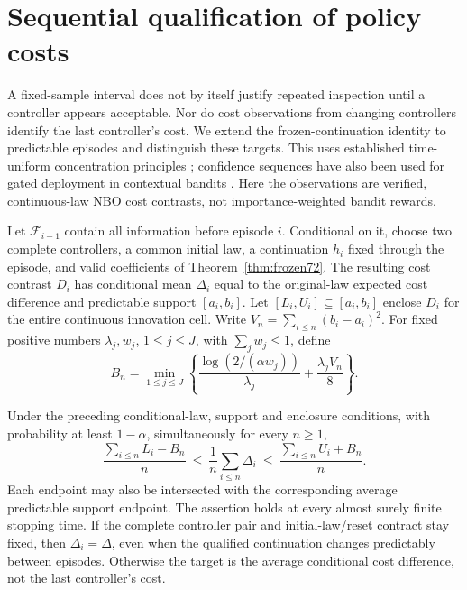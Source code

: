 \section{Sequential qualification of policy costs}\label{sec:sequential73}
A fixed-sample interval does not by itself justify repeated inspection until a controller appears acceptable. Nor do cost observations from changing controllers identify the last controller's cost. We extend the frozen-continuation identity to predictable episodes and distinguish these targets. This uses established time-uniform concentration principles \citep{howard2020time}; confidence sequences have also been used for gated deployment in contextual bandits \citep{karampatziakis2021}. Here the observations are verified, continuous-law NBO cost contrasts, not importance-weighted bandit rewards.

Let $\mathcal F_{i-1}$ contain all information before episode $i$. Conditional on it, choose two complete controllers, a common initial law, a continuation $h_i$ fixed through the episode, and valid coefficients of Theorem~\ref{thm:frozen72}. The resulting cost contrast $D_i$ has conditional mean $\Delta_i$ equal to the original-law expected cost difference and predictable support $[a_i,b_i]$. Let $[L_i,U_i]\subseteq[a_i,b_i]$ enclose $D_i$ for the entire continuous innovation cell. Write $V_n=\sum_{i\le n}(b_i-a_i)^2$. For fixed positive numbers $\lambda_j,w_j$, $1\le j\le J$, with $\sum_jw_j\le1$, define
\begin{equation}\label{eq:anytime-boundary73}
 B_n=\min_{1\le j\le J}
       \left\{\frac{\log(2/(\alpha w_j))}{\lambda_j}
                    +\frac{\lambda_j V_n}{8}\right\}.
\end{equation}

\begin{theorem}\label{thm:anytime73}
Under the preceding conditional-law, support and enclosure conditions, with probability at least $1-\alpha$, simultaneously for every $n\ge1$,
\begin{equation}\label{eq:anytime-interval73}
 \frac{\sum_{i\le n}L_i-B_n}{n}
 \ \le\ \frac1n\sum_{i\le n}\Delta_i
 \ \le\ \frac{\sum_{i\le n}U_i+B_n}{n}.
\end{equation}
Each endpoint may also be intersected with the corresponding average predictable support endpoint. The assertion holds at every almost surely finite stopping time. If the complete controller pair and initial-law/reset contract stay fixed, then $\Delta_i=\Delta$, even when the qualified continuation changes predictably between episodes. Otherwise the target is the average conditional cost difference, not the last controller's cost.
\end{theorem}

